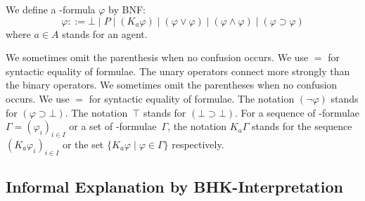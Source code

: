   \begin{definition}
   \label{formula}
   We define a \iec-formula $\varphi$ by BNF:
   \[
   \varphi ::= \bot\mid P\mid
   (K_a\varphi)\mid(\varphi\vee\varphi)\mid(\varphi\land\varphi)\mid
   (\varphi\supset\varphi)
   \]
   where $a\in A$ stands for an agent.
  \end{definition}
  We sometimes omit the parenthesis when no confusion occurs. We use $=$ for syntactic
  equality of formulae.
  \noindent The unary operators connect more strongly than the binary operators.
  We sometimes omit the parentheses when no confusion occurs. We use $=$ for syntactic
  equality of formulae.  The notation $(\neg \varphi)$ stands for $(\varphi\supset \bot)$.
  The notation~$\top$ stands for $(\bot\supset\bot)$.
  For a sequence of \iec-formulae $\Gamma = (\varphi_i)_{i\in I}$ or a set of \iec-formulae~$\Gamma$,
  the notation $K_a \Gamma$ stands for the sequence $(K_a \varphi_i)_{i\in I}$ or the set
  $\{K_a\varphi\mid \varphi\in \Gamma\}$ respectively.

  \subsection{Informal Explanation by BHK-Interpretation}
  \label{bhk}

